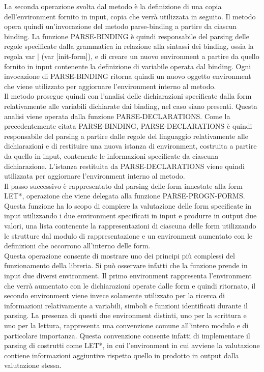 La seconda operazione svolta dal metodo è la definizione di una copia
dell’environment fornito in input, copia che verrà utilizzata in seguito. Il
metodo opera quindi un’invocazione del metodo parse-binding a partire da
ciascun binding. La funzione PARSE-BINDING è quindi responsabile del parsing
delle regole specificate dalla grammatica in relazione alla sintassi dei
binding, ossia la regola var | (var [init-form]), e di creare un nuovo
environment a partire da quello fornito in input contenente la definizione di
variabile operata dal binding. Ogni invocazione di PARSE-BINDING ritorna
quindi un nuovo oggetto environment che viene utilizzato per aggiornare
l’environment interno al metodo.\\

Il metodo prosegue quindi con l’analisi delle dichiarazioni specificate dalla
form relativamente alle variabili dichiarate dai binding, nel caso siano
presenti. Questa analisi viene operata dalla funzione PARSE-DECLARATIONS. Come
la precedentemente citata PARSE-BINDING, PARSE-DECLARATIONS è quindi
responsabile del parsing a partire dalle regole del linguaggio relativamente
alle dichiarazioni e di restituire una nuova istanza di environment, costruita
a partire da quello in input, contenente le informazioni specificate da
ciascuna dichiarazione. L’istanza restituita da PARSE-DECLARATIONS viene
quindi utilizzata per aggiornare l’environment interno al metodo.\\

Il passo successivo è rappresentato dal parsing delle form innestate alla form
LET*, operazione che viene delegata alla funzione PARSE-PROGN-FORMS. Questa
funzione ha lo scopo di compiere la valutazione delle form specificate in
input utilizzando i due environment specificati in input e produrre in output
due valori, una lista contenente la rappresentazioni di ciascuna delle form
utilizzando le strutture dal modulo di rappresentazione e un environment
aumentato con le definizioni che occorrono all’interno delle form.\\

Questa operazione consente di mostrare uno dei principi più complessi del
funzionamento della libreria. Si può osservare infatti che la funzione prende
in input due diversi environment. Il primo environment rappresenta
l’environment che verrà aumentato con le dichiarazioni operate dalle form e
quindi ritornato, il secondo environment viene invece solamente utilizzato per
la ricerca di informazioni relativamente a variabili, simboli e funzioni
identificati durante il parsing. La presenza di questi due environment
distinti, uno per la scrittura e uno per la lettura, rappresenta una
convenzione comune all’intero modulo e di particolare importanza. Questa
convenzione consente infatti di implementare il parsing di costrutti come
LET*, in cui l’environment in cui avviene la valutazione contiene informazioni
aggiuntive rispetto quello in prodotto in output dalla valutazione stessa.\\

